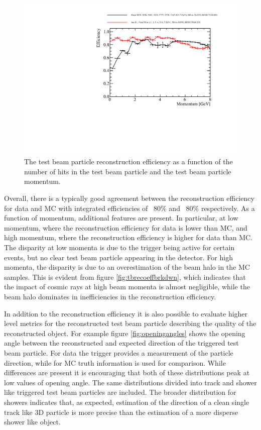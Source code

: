 \begin{figure}
\includegraphics[width=1.0\textwidth]{Figures/Metrics/Data/Beam/BeamParticleEfficiencyVsMomentum.pdf}
\caption{The test beam particle reconstruction efficiency as a function of the number of hits in the test beam particle and the test beam particle momentum.}
\label{fig:datamcrecoeff}
\end{figure}

Overall, there is a typically good agreement between the reconstruction efficiency for data and MC with integrated efficiencies of ~80\% and ~80\% respectively.  As a function of momentum, additional features are present.  In particular, at low momentum, where the reconstruction efficiency for data is lower than MC, and high momentum, where the reconstruction efficiency is higher for data than MC.  The disparity at low momenta is due to the trigger being active for certain events, but no clear test beam particle appearing in the detector.   For high momenta, the disparity is due to an overestimation of the beam halo in the MC samples.  This is evident from figure \ref{fig:tbrecoeffbrkdwn}, which indicates that the impact of cosmic rays at high beam momenta is almost negligible, while the beam halo dominates in inefficiencies in the reconstruction efficiency.  

In addition to the reconstruction efficiency it is also possible to evaluate higher level metrics for the reconstructed test beam particle describing the quality of the reconstructed object.  For example figure \ref{fig:openingangles} shows the opening angle between the reconstructed and expected direction of the triggered test beam particle.  For data the trigger provides a measurement of the particle direction, while for MC truth information is used for comparison.  While differences are present it is encouraging that both of these distributions peak at low values of opening angle.  The same distributions divided into track and shower like triggered test beam particles are included.  The broader distribution for showers indicates that, as expected, estimation of the direction of a clean single track like 3D particle is more precise than the estimation of a more disperse shower like object.   

